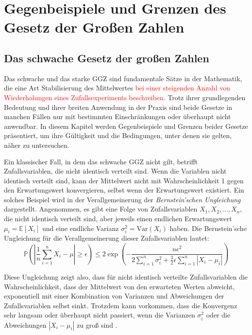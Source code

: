 \documentclass[aodsor,preprint]{imsart}
\numberwithin{equation}{section}
\theoremstyle{plain}
\begin{document}
\section{Gegenbeispiele und Grenzen des Gesetz der Großen Zahlen}
\label{sec:grenzen}


\subsection{Das schwache Gesetz der großen Zahlen}


Das schwache und das starke GGZ sind fundamentale Sätze in der Mathematik, die eine Art Stabilisierung des Mittelwertes \textcolor{red}{bei einer steigenden Anzahl von Wiederholungen eines Zufallsexperiments beschreiben.}
Trotz ihrer grundlegenden Bedeutung und ihrer breiten Anwendung in der Praxis sind beide Gesetze in manchen Fällen nur mit bestimmten Einschränkungen oder überhaupt nicht anwendbar.
In diesem Kapitel werden Gegenbeispiele und Grenzen beider Gesetze präsentiert, um ihre Gültigkeit und die Bedingungen, unter denen sie gelten, näher zu untersuchen.


Ein klassischer Fall, in dem das schwache GGZ nicht gilt, betrifft Zufallsvariablen, die nicht identisch verteilt sind.
Wenn die Variablen nicht identisch verteilt sind, kann der Mittelwert nicht mit Wahrscheinlichkeit 1 gegen den Erwartungswert konvergieren, selbst wenn der Erwartungswert existiert.
Ein solches Beispiel wird in der Verallgemeinerung der \textit{Bernstein'schen Ungleichung} dargestellt.
Angenommen, es gibt eine Folge von Zufallsvariablen \(X_1, X_2, \dots, X_n\), die nicht identisch verteilt sind, aber jeweils einen endlichen Erwartungswert \(\mu_i = \mathbb{E}[X_i]\) und eine endliche Varianz \(\sigma_i^2 = \text{Var}(X_i)\) haben. Die Bernstein'sche Ungleichung für die Verallgemeinerung dieser Zufallsvariablen lautet:
\[
\mathbb{P}\left( \left|\frac{1}{n} \sum_{i=1}^n X_i - \mu \right| \geq \epsilon \right) \leq 2 \exp \left( -\frac{n \epsilon^2}{2 \sum_{i=1}^n \sigma_i^2 + \frac{3}{2} \epsilon \sum_{i=1}^n |X_i - \mu_i|} \right)
\]

Diese Ungleichung zeigt also, dass für nicht identisch verteilte Zufallsvariablen die Wahrscheinlichkeit, dass der Mittelwert von den erwarteten Werten abweicht, exponentiell mit einer Kombination von Varianzen und Abweichungen der Zufallsvariablen selbst sinkt.
Trotzdem kann vorkommen, dass die Konvergenz sehr langsam oder überhaupt nicht passiert, wenn die Varianzen \(\sigma_i^2\) oder die Abweichungen \(|X_i - \mu_i|\) zu groß sind \citep{stoyanov2013}.
\end{document}
